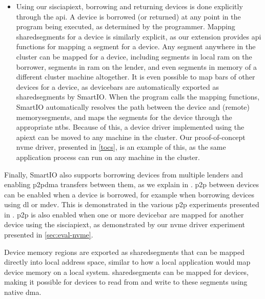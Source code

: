 \begin{itemize}
    \item Using our \gls{sisciapiext}, borrowing and returning devices is done explicitly through the \gls{api}.
        A device is borrowed (or returned) at any point in the program being executed, as determined by the programmer.
        Mapping \glspl{sharedsegment} for a device is similarly explicit, as our extension provides \gls{api} functions for mapping a \gls{segment} for a device.
        Any \gls{segment} anywhere in the cluster can be mapped for a device, including \glspl{segment} in local \gls{ram} on the borrower, \glspl{segment} in \gls{ram} on the \gls{lender}, and even \glspl{segment} in memory of a different cluster machine altogether.
        It is even possible to map \glspl{bar} of other devices for a device, as \glspl{devicebar} are automatically exported as \glspl{sharedsegment} by SmartIO.
        When the program calls the mapping functions, SmartIO automatically resolves the path between the device and (remote) \glspl{memorysegment}, and maps the \glspl{segment} for the device through the appropriate \glspl{ntb}.
        Because of this, a device driver implemented using the \gls{apiext} can be moved to any machine in the cluster.
        Our proof-of-concept \gls{nvme} driver, presented in \cref{tocs}, is an example of this, as the same application process can run on any machine in the cluster.
\end{itemize}
%
Finally, SmartIO also supports borrowing devices from multiple \glspl{lender} and enabling \gls{p2pdma} transfers between them, as we explain in .
%
\Gls{p2p} between devices can be enabled when a device is borrowed, for example when borrowing devices using \gls{dl} or \gls{mdev}.
%
This is demonstrated in the various \gls{p2p} experiments presented in .
%
\Gls{p2p} is also enabled when one or more \gls{devicebar} are mapped for another device using the \gls{sisciapiext}, as demonstrated by our \gls{nvme} driver experiment presented in \cref{sec:eval-nvme}.



\objdisaggregation*%
        Device memory regions are exported as \glspl{sharedsegment} that can be mapped directly into local address space, similar to how a local application would map device memory on a local system.
        \Glspl{sharedsegment} can be mapped for devices, making it possible for devices to read from and write to these \glspl{segment} using native \gls{dma}.

